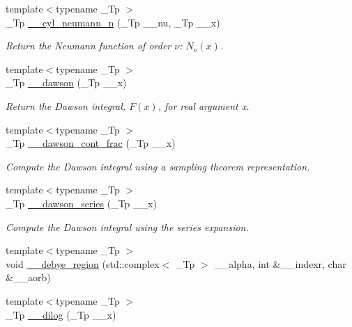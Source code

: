 \begin{DoxyCompactItemize}
{\footnotesize template$<$typename \+\_\+\+Tp $>$ }\\\+\_\+\+Tp \hyperlink{namespacestd_1_1____detail_ae414a6b5c064dc2b9b9a3b28e6cec813}{\+\_\+\+\_\+cyl\+\_\+neumann\+\_\+n} (\+\_\+\+Tp \+\_\+\+\_\+nu, \+\_\+\+Tp \+\_\+\+\_\+x)
\begin{DoxyCompactList}\small\item\em Return the Neumann function of order $ \nu $\+: $ N_{\nu}(x) $. \end{DoxyCompactList}\item 
{\footnotesize template$<$typename \+\_\+\+Tp $>$ }\\\+\_\+\+Tp \hyperlink{namespacestd_1_1____detail_a6384fb4c5af31b41a38c120869a548c7}{\+\_\+\+\_\+dawson} (\+\_\+\+Tp \+\_\+\+\_\+x)
\begin{DoxyCompactList}\small\item\em Return the Dawson integral, $ F(x) $, for real argument {\ttfamily x}. \end{DoxyCompactList}\item 
{\footnotesize template$<$typename \+\_\+\+Tp $>$ }\\\+\_\+\+Tp \hyperlink{namespacestd_1_1____detail_a3ad3b7b4dcebdf69778dbf7a5ba2427c}{\+\_\+\+\_\+dawson\+\_\+cont\+\_\+frac} (\+\_\+\+Tp \+\_\+\+\_\+x)
\begin{DoxyCompactList}\small\item\em Compute the Dawson integral using a sampling theorem representation. \end{DoxyCompactList}\item 
{\footnotesize template$<$typename \+\_\+\+Tp $>$ }\\\+\_\+\+Tp \hyperlink{namespacestd_1_1____detail_a033d91cc1c67280385ff3d1d809a21d1}{\+\_\+\+\_\+dawson\+\_\+series} (\+\_\+\+Tp \+\_\+\+\_\+x)
\begin{DoxyCompactList}\small\item\em Compute the Dawson integral using the series expansion. \end{DoxyCompactList}\item 
{\footnotesize template$<$typename \+\_\+\+Tp $>$ }\\void \hyperlink{namespacestd_1_1____detail_a3212c0a136417e862f2ed8e9684e053c}{\+\_\+\+\_\+debye\+\_\+region} (std\+::complex$<$ \+\_\+\+Tp $>$ \+\_\+\+\_\+alpha, int \&\+\_\+\+\_\+indexr, char \&\+\_\+\+\_\+aorb)
\item 
{\footnotesize template$<$typename \+\_\+\+Tp $>$ }\\\+\_\+\+Tp \hyperlink{namespacestd_1_1____detail_a5083a0c9fce3299593ca22e7dbaeaf19}{\+\_\+\+\_\+dilog} (\+\_\+\+Tp \+\_\+\+\_\+x)

\end{DoxyCompactItemize}
